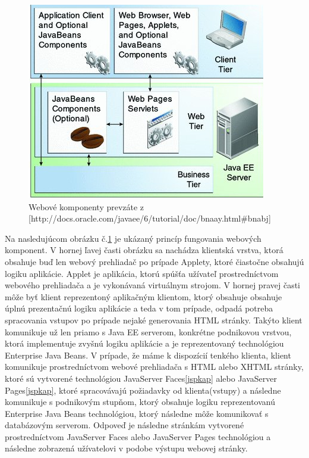 \begin{figure}[htb]

\begin{center}

\includegraphics[scale=0.5]{webtechnology.jpg} 
\caption{Webové komponenty prevzáte z [http://docs.oracle.com/javaee/6/tutorial/doc/bnaay.html#bnabj] }
\label{web}

\end{center}

\end{figure}
Na nasledujúcom obrázku č.\ref{web} je ukázaný princíp fungovania webových komponent. V hornej ľavej časti obrázku sa nachádza klientská vrstva, ktorá obsahuje buď len webový prehliadač po prípade Applety, ktoré čiastočne obsahujú logiku aplikácie. Applet je aplikácia, ktorú spúšťa užívateľ prostredníctvom webového prehliadača a je vykonávaná virtuálnym strojom. V hornej pravej časti môže byť klient reprezentoný aplikačným klientom, ktorý obsahuje obsahuje úplnú prezentačnú logiku aplikácie a teda v tom prípade, odpadá potreba spracovania vstupov po prípade nejaké generovania HTML stránky. Takýto klient komunikuje už len priamo s Java EE serverom, konkrétne podnikovou vrstvou, ktorá implementuje zvyšnú logiku aplikácie a je reprezentovaný technológiou Enterprise Java Beans. V prípade, že máme k dispozícií tenkého klienta, klient komunikuje prostredníctvom webové prehliadača s HTML alebo XHTML stránky, ktoré sú vytvorené technológiou JavaServer Faces\ref{jspkap} alebo JavaServer Pages\ref{jspkap}, ktoré spracovávajú požiadavky od klienta(vstupy) a následne komunikuje s podnikovým stupňom, ktorý obsahuje logiku reprezentovanú Enterprise Java Beans technológiou, ktorý následne môže komunikovať s databázovým serverom. Odpoveď je následne  stránkám vytvorené prostredníctvom JavaServer Faces alebo JavaServer Pages technológiou a následne zobrazená užívatelovi v podobe výstupu webovej stránky. 


